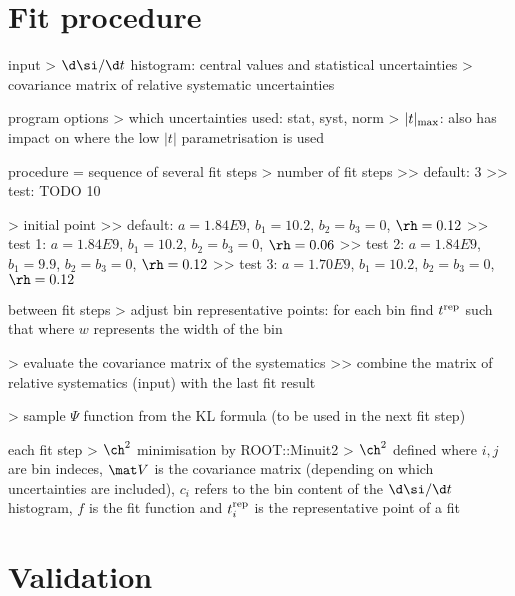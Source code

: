 \chapter[fit]{Fit procedure}

\> input
\>> $\d\si/\d t$ histogram: central values and statistical uncertainties
\>> covariance matrix of relative systematic uncertainties

\> program options
\>> which uncertainties used: stat, syst, norm
\>> $|t|_{\rm max}$: also has impact on where the low $|t|$ parametrisation is used

\> procedure = sequence of several fit steps
\>> number of fit steps
\>>> default: 3
\>>> test: TODO 10

\>> initial point
\>>> default: $a = 1.84E9$, $b_1 = 10.2$, $b_2 = b_3 = 0$, $\rh = 0.12$
\>>> test 1: $a = 1.84E9$, $b_1 = 10.2$, $b_2 = b_3 = 0$, $\rh = 0.06$
\>>> test 2: $a = 1.84E9$, $b_1 = 9.9$, $b_2 = b_3 = 0$, $\rh = 0.12$
\>>> test 3: $a = 1.70E9$, $b_1 = 10.2$, $b_2 = b_3 = 0$, $\rh = 0.12$

\> between fit steps
\>> adjust bin representative points: for each bin find $t^{\rm rep}$ such that
where $w$ represents the width of the bin

\>> evaluate the covariance matrix of the systematics
\>>> combine the matrix of relative systematics (input) with the last fit result

\>> sample $\Psi$ function from the KL formula (to be used in the next fit step)

\> each fit step
\>> $\ch^2$ minimisation by ROOT::Minuit2
\>> $\ch^2$ defined
where $i,j$ are bin indeces, $\mat V$ is the covariance matrix (depending on which uncertainties are included), $c_i$ refers to the bin content of the $\d\si/\d t$ histogram, $f$ is the fit function and $t^{\rm rep}_i$ is the representative point of a fit

%


\chapter{Validation}

